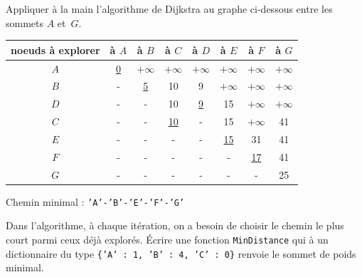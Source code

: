 \begin{exercice}
Appliquer à la main l'algorithme de Dijkstra au graphe ci-dessous entre les sommets $A$ et~$G$.
\begin{center}
\end{center}
\end{exercice}

\begin{solution}
\begin{center}
\begin{tabular}{|c||c|c|c|c|c|c|c|}
\hline
noeuds à explorer & à $A$ & à $B$ & à $C$ & à $D$ & à $E$ &  à $F$ & à $G$ \\
\hline
\hline
$A$ & \underline{0} & $+\infty$ & $+\infty$ & $+\infty$ & $+\infty$ & $+\infty$ & $+\infty$ \\
\hline
$B$ & - & \underline{5} & 10 & 9 & $+\infty$ & $+\infty$ & $+\infty$ \\
\hline
$D$ & - &- & 10 & \underline{9} & 15 & $+\infty$ & $+\infty$ \\
\hline
$C$ & - &- & \underline{10} & - & 15 & $+\infty$ & 41 \\
\hline
$E$ & - &- & - & - & \underline{15} & 31 & 41 \\
\hline
$F$ & - &- & - & - & - & \underline{17} & 41 \\
\hline
$G$ & - &- & - & - & - & - & 25 \\
\hline
\end{tabular}
\end{center}
Chemin minimal : \texttt{'A'-'B'-'E'-'F'-'G'}
\end{solution}


\begin{exercice}
Dans l'algorithme, à chaque itération, on a besoin de choisir le chemin le plus court parmi ceux déjà explorés. 
Écrire une fonction \texttt{MinDistance} qui à un dictionnaire du type \texttt{\{'A' : 1, 'B' : 4, 'C' : 0\}} renvoie le sommet de poids minimal.
\end{exercice}

